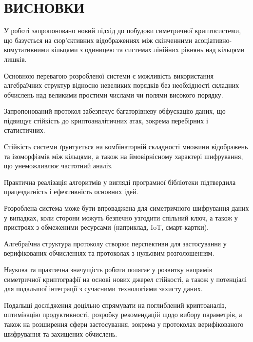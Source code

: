 \chapter{ВИСНОВКИ}

У роботі запропоновано новий підхід до побудови симетричної криптосистеми, що базується на сюр’єктивних відображеннях між скінченними асоціативно-комутативними кільцями з одиницею та системах лінійних рівнянь над кільцями лишків.

Основною перевагою розробленої системи є можливість використання алгебраїчних структур відносно невеликих порядків без необхідності складних обчислень над великими простими числами чи полями високого порядку.

Запропонований протокол забезпечує багаторівневу обфускацію даних, що підвищує стійкість до криптоаналітичних атак, зокрема перебірних і статистичних.

Стійкість системи ґрунтується на комбінаторній складності множини відображень та ізоморфізмів між кільцями, а також на ймовірнісному характері шифрування, що унеможливлює частотний аналіз.

Практична реалізація алгоритмів у вигляді програмної бібліотеки підтвердила працездатність і ефективність основних ідей.

Розроблена система може бути впроваджена для симетричного шифрування даних у випадках, коли сторони можуть безпечно узгодити спільний ключ, а також у пристроях з обмеженими ресурсами (наприклад, IoT, смарт-картки).

Алгебраїчна структура протоколу створює перспективи для застосування у верифікованих обчисленнях та протоколах з нульовим розголошенням.

Наукова та практична значущість роботи полягає у розвитку напрямів симетричної криптографії на основі нових джерел стійкості, а також у потенціалі для подальшої інтеграції з сучасними технологіями захисту даних.

Подальші дослідження доцільно спрямувати на поглиблений криптоаналіз, оптимізацію продуктивності, розробку рекомендацій щодо вибору параметрів, а також на розширення сфери застосування, зокрема у протоколах верифікованого шифрування та захищених обчислень.